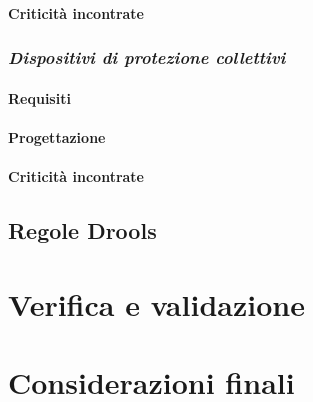 	\paragraph{Criticità incontrate}
\subsubsection{\textit{Dispositivi di protezione collettivi}}
	\paragraph{Requisiti}
	\paragraph{Progettazione}
	\paragraph{Criticità incontrate}
		


\subsection{Regole Drools}
	
\section{Verifica e validazione}
\section{Considerazioni finali}